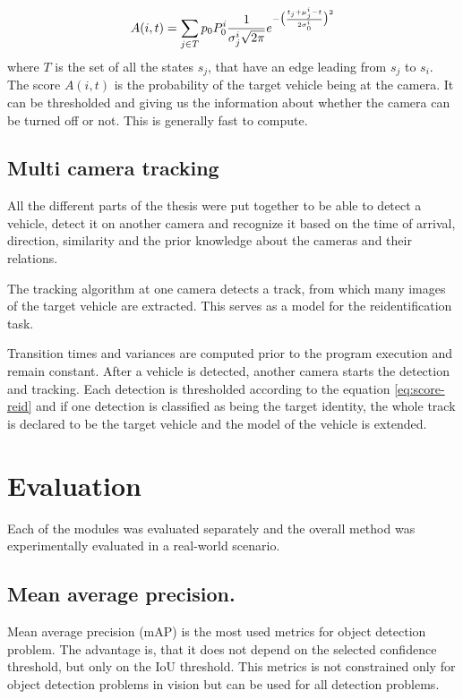 \documentclass[a4paper,11pt,titlepage,twoside]{article}
\numberwithin{figure}{section}
\begin{document}
\begin{equation}
A(i, t) = \sum_{j \in T}p_0 P_0^i \frac{1}{\sigma_j^i \sqrt{2\pi}}e^{-\big{(}\frac{t_j + \mu_j^i - t}{2\sigma_0^i}\big{)}^2}
\end{equation}
where $T$ is the set of all the states $s_j$, that have an edge leading from $s_j$ to $s_i$. The score $A(i, t)$ is the probability of the target vehicle being at the camera. It can be thresholded and giving us the information about whether the camera can be turned off or not.
This is generally fast to compute.


\subsection{Multi camera tracking}

All the different parts of the thesis were put together to be able to detect a vehicle, detect it on another camera and recognize it based on the time of arrival, direction, similarity and the prior knowledge about the cameras and their relations. 

The tracking algorithm at one camera detects a track, from which many images of the target vehicle are extracted. This serves as a model for the reidentification task. 

Transition times and variances are computed prior to the program execution and remain constant. After a vehicle is detected, another camera starts the detection and tracking. Each detection is thresholded according to the equation \ref{eq:score-reid} and if one detection is classified as being the target identity, the whole track is declared to be the target vehicle and the model of the vehicle is extended.

\clearpage
\section{Evaluation}
Each of the modules was evaluated separately and the overall method was experimentally evaluated in a real-world scenario.

\subsection{Mean average precision.}
\label{sec:mAP}
Mean average precision (mAP) is the most used metrics for object detection problem. The advantage is, that it does not depend on the selected confidence threshold, but only on the IoU threshold. This metrics is not constrained only for object detection problems in vision but can be used for all detection problems. 
\end{document}
